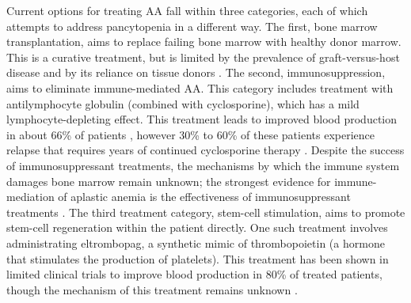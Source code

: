 \documentclass{article}
\begin{document}
Current options for treating AA fall within three categories, each of which attempts to address pancytopenia in a different way.
The first, bone marrow transplantation, aims to replace failing bone marrow with healthy donor marrow. 
This is a curative treatment, but is limited by the prevalence of graft-versus-host disease and by its reliance on tissue donors \citep{young_aplastic_2018}.
The second, immunosuppression, aims to eliminate immune-mediated AA.
This category includes treatment with antilymphocyte globulin (combined with cyclosporine), which has a mild lymphocyte-depleting effect.
This treatment leads to improved blood production in about 66\% of patients \citep{bacigalupo_how_2017}, however 30\% to 60\% of these patients experience relapse that requires years of continued cyclosporine therapy \citep{scheinberg_activity_2012}.
Despite the success of immunosuppressant treatments, the mechanisms by which the immune system damages bone marrow remain unknown; the strongest evidence for immune-mediation of aplastic anemia is the effectiveness of immunosuppressant treatments \citep{young_aplastic_2018}.
The third treatment category, stem-cell stimulation, aims to promote stem-cell regeneration within the patient directly.
One such treatment involves administrating eltrombopag, a synthetic mimic of thrombopoietin (a hormone that stimulates the production of platelets).
This treatment has been shown in limited clinical trials to improve blood production in 80\% of treated patients, though the mechanism of this treatment remains unknown \citep{young_aplastic_2018}.
\end{document}
